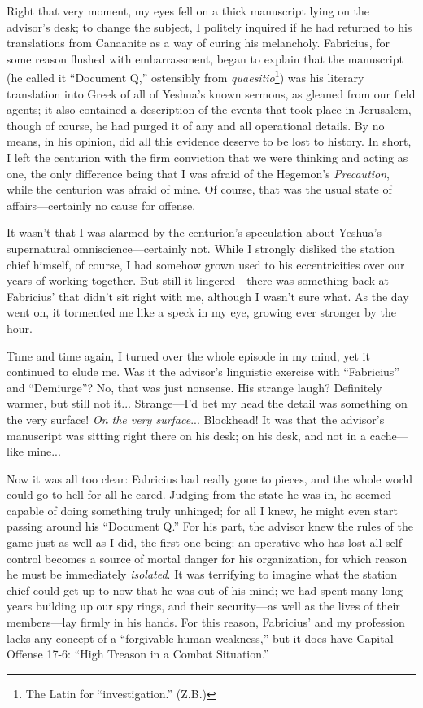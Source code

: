 Right that very moment, my eyes fell on a thick manuscript lying on the advisor's desk; to change the subject, I politely inquired if he had returned to his translations from Canaanite as a way of curing his melancholy. Fabricius, for some reason flushed with embarrassment, began to explain that the manuscript (he called it ``Document Q,'' ostensibly from \emph{quaesitio}\footnote{The Latin for ``investigation.'' (Z.B.)}) was his literary translation into Greek of all of Yeshua's known sermons, as gleaned from our field agents; it also contained a description of the events that took place in Jerusalem, though of course, he had purged it of any and all operational details. By no means, in his opinion, did all this evidence deserve to be lost to history. In short, I left the centurion with the firm conviction that we were thinking and acting as one, the only difference being that I was afraid of the Hegemon's \emph{Precaution}, while the centurion was afraid of mine. Of course, that was the usual state of affairs---certainly no cause for offense.

It wasn't that I was alarmed by the centurion's speculation about Yeshua's supernatural omniscience---certainly not. While I strongly disliked the station chief himself, of course, I had somehow grown used to his eccentricities over our years of working together. But still it lingered---there was something back at Fabricius' that didn't sit right with me, although I wasn't sure what. As the day went on, it tormented me like a speck in my eye, growing ever stronger by the hour.

Time and time again, I turned over the whole episode in my mind, yet it continued to elude me. Was it the advisor's linguistic exercise with ``Fabricius'' and ``Demiurge''? No, that was just nonsense. His strange laugh? Definitely warmer, but still not it... Strange---I'd bet my head the detail was something on the very surface! \emph{On the very surface}... Blockhead! It was that the advisor's manuscript was sitting right there on his desk; on his desk, and not in a cache---like mine...

Now it was all too clear: Fabricius had really gone to pieces, and the whole world could go to hell for all he cared. Judging from the state he was in, he seemed capable of doing something truly unhinged; for all I knew, he might even start passing around his ``Document Q.'' For his part, the advisor knew the rules of the game just as well as I did, the first one being: an operative who has lost all self-control becomes a source of mortal danger for his organization, for which reason he must be immediately \emph{isolated}. It was terrifying to imagine what the station chief could get up to now that he was out of his mind; we had spent many long years building up our spy rings, and their security---as well as the lives of their members---lay firmly in his hands. For this reason, Fabricius' and my profession lacks any concept of a ``forgivable human weakness,'' but it does have Capital Offense 17-6: ``High Treason in a Combat Situation.'' 

